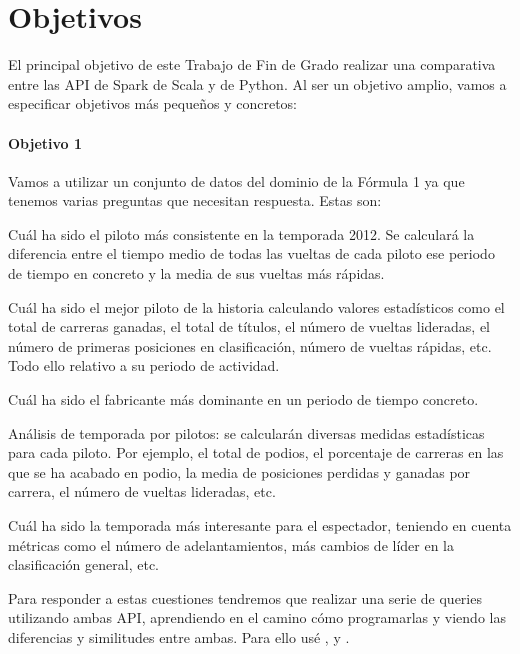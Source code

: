 \documentclass[12pt,twoside,titlepage]{report}
\begin{document}
\chapter{Objetivos}
\newpage

El principal objetivo de este Trabajo de Fin de Grado realizar una comparativa entre las API de Spark de Scala y de Python. Al ser un objetivo amplio, vamos a especificar objetivos más pequeños y concretos:


\subsubsection{Objetivo 1}

Vamos a utilizar un conjunto de datos del dominio de la Fórmula 1 ya que tenemos varias preguntas que necesitan respuesta. Estas son:

\begin{compactitem}
  \item Cuál ha sido el piloto más consistente en la temporada 2012. Se calculará la diferencia entre el tiempo medio de todas las vueltas de cada piloto ese periodo de tiempo en concreto y la media de sus vueltas más rápidas.
  \item Cuál ha sido el mejor piloto de la historia calculando valores estadísticos como el total de carreras ganadas, el total de títulos, el número de vueltas lideradas, el número de primeras posiciones en clasificación, número de vueltas rápidas, etc. Todo ello relativo a su periodo de actividad.
  \item Cuál ha sido el fabricante más dominante en un periodo de tiempo concreto.
  \item Análisis de temporada por pilotos: se calcularán diversas medidas estadísticas para cada piloto. Por ejemplo, el total de podios, el porcentaje de carreras en las que se ha acabado en podio, la media de posiciones perdidas y ganadas por carrera, el número de vueltas lideradas, etc.
  \item Cuál ha sido la temporada más interesante para el espectador, teniendo en cuenta métricas como el número de adelantamientos, más cambios de líder en la clasificación general, etc.
\end{compactitem}

Para responder a estas cuestiones tendremos que realizar una serie de queries utilizando ambas API, aprendiendo en el camino cómo programarlas y viendo las diferencias y similitudes entre ambas. Para ello usé \cite{sparkbook}, \cite{Spark} y \cite{PySpark}.
\end{document}
